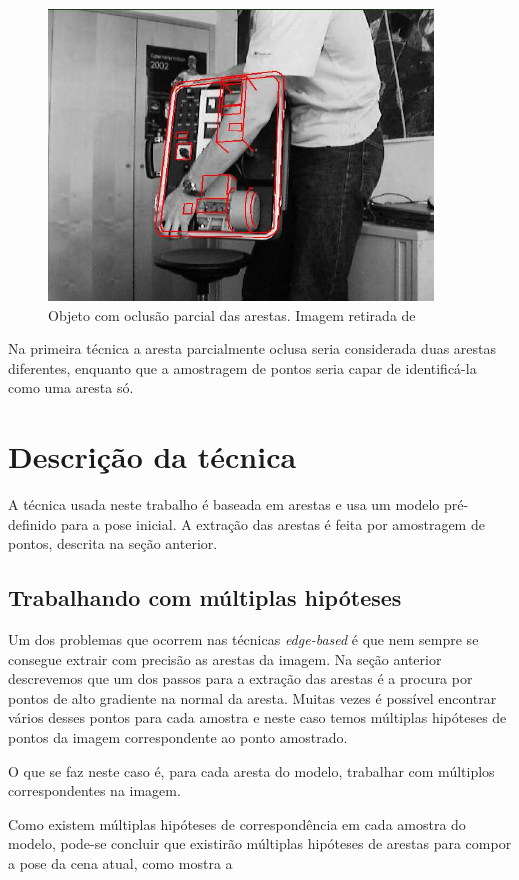 \begin{figure}[ht!]
\centering
\includegraphics{monografia/occlusion.png}
\caption{Objeto com oclusão parcial das arestas. Imagem retirada de \cite{wuest}}
\label{occlusion}
\end{figure}

Na primeira técnica a aresta parcialmente oclusa seria considerada duas arestas diferentes, enquanto que a amostragem de pontos seria capar de identificá-la como uma aresta só.

\chapter{Descrição da técnica}

A técnica usada neste trabalho é baseada em arestas e usa um modelo pré-definido para a pose inicial. A extração das arestas é feita por amostragem de pontos, descrita na seção anterior.

\section{Trabalhando com múltiplas hipóteses}

Um dos problemas que ocorrem nas técnicas \emph{edge-based} é que nem sempre se consegue extrair com precisão as arestas da imagem. Na seção anterior descrevemos que um dos passos para a extração das arestas é a procura por pontos de alto gradiente na normal da aresta. Muitas vezes é possível encontrar vários desses pontos para cada amostra e neste caso temos múltiplas hipóteses de pontos da imagem correspondente ao ponto amostrado.

O que se faz neste caso é, para cada aresta do modelo, trabalhar com múltiplos correspondentes na imagem.

Como existem múltiplas hipóteses de correspondência em cada amostra do modelo, pode-se concluir que existirão múltiplas hipóteses de arestas para compor a pose da cena atual, como mostra a 

